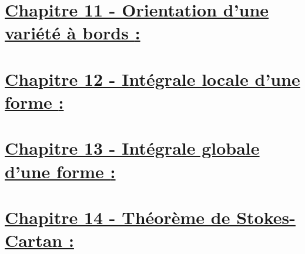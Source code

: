 \section*{\uline{Chapitre 11 - Orientation d'une variété à bords {:}}}
\section*{\uline{Chapitre 12 - Intégrale locale d'une forme {:}}}
\section*{\uline{Chapitre 13 - Intégrale globale d'une forme {:}}}
\section*{\uline{Chapitre 14 - Théorème de Stokes-Cartan {:}}}
